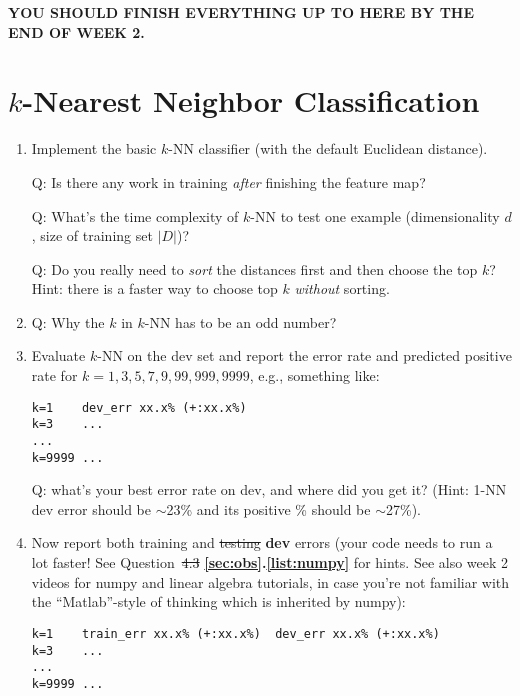 \documentclass[11pt]{article}
\newcommand{\update}[1]{{\bf\color{black} #1}}
\begin{document}
\bigskip
{\color{black}\bf YOU SHOULD FINISH EVERYTHING UP TO HERE BY THE END OF WEEK 2.}

\section{$k$-Nearest Neighbor Classification}

\begin{enumerate}

\item Implement the basic $k$-NN classifier (with the default Euclidean distance).

 
 Q: Is there any work in training {\em after} finishing the feature map?

  Q: What's the time complexity of $k$-NN to test one example (dimensionality $d$, size of training set $|D|$)?
  
  Q:  Do you really need to {\em sort} the distances  first and then choose the top $k$? Hint: there is a faster way to choose top $k$ {\em without} sorting.

\item
  Q: Why the $k$ in $k$-NN has to be an odd number?
  
\item
Evaluate $k$-NN on the dev set and report the error rate and predicted positive rate for $k=1,3,5,7,9,99,999,9999$, e.g., something like:

\begin{verbatim}
k=1    dev_err xx.x% (+:xx.x%) 
k=3    ...
...
k=9999 ...
\end{verbatim}

Q: what's your best error rate on dev, and where did you get it? 
(Hint: 1-NN dev error should be $\sim$23\% and its positive \% should be $\sim$27\%).

\item
  Now report both training and \sout{testing} \update{dev} errors (your code needs to run a lot faster!
  See Question~\sout{4.3} \update{\ref{sec:obs}.\ref{list:numpy}} for hints. See also week 2 videos for numpy and linear algebra tutorials, in case you're not familiar with the ``Matlab''-style of thinking which is inherited by numpy):
  
\begin{verbatim}
k=1    train_err xx.x% (+:xx.x%)  dev_err xx.x% (+:xx.x%) 
k=3    ...
...
k=9999 ...
\end{verbatim}


\end{enumerate}
\end{document}
